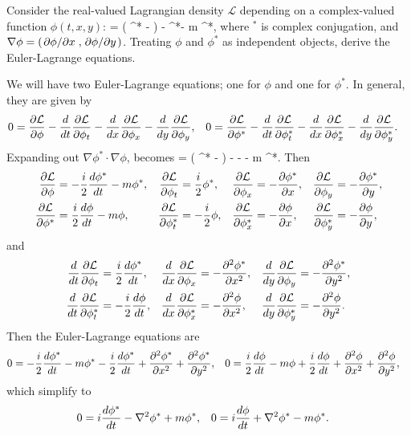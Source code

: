 \newcommand{\lap}{\nabla^2}
\newcommand{\Ld}{\mathcal{L}}
\newcommand{\phis}{\phi^*}

\newcommand{\phit}{\phi_t}
\newcommand{\phix}{\phi_x}
\newcommand{\phiy}{\phi_y}

\newcommand{\phist}{\phis_t}
\newcommand{\phisx}{\phis_x}
\newcommand{\phisy}{\phis_y}

\begin{problem}
	Consider the real-valued Lagrangian density $\Ld$ depending on a complex-valued function $\phi(t, x, y)$:
	\beqn \label{lagr2}
		\Ld =  \left( \phis {} - \dv{\phis}{t} \phi \right) - \nabla \phis \cdot \nabla \phi - m \phis \phi,
	\eeqn
	where $^*$ is complex conjugation, and $\nabla \phi = (\pdv*{\phi}{x}, \pdv*{\phi}{y})$.  Treating $\phi$ and $\phis$ as independent objects, derive the Euler-Lagrange equations.
\end{problem}

\begin{solution}
	We will have two Euler-Lagrange equations; one for $\phi$ and one for $\phis$.  In general, they are given by
	\begin{align*}
		0 &= \pdv{\Ld}{\phi} - \dv{}{t} \pdv{\Ld}{\phit} - \dv{}{x} \pdv{\Ld}{\phix} - \dv{}{y} \pdv{\Ld}{\phiy}, &
		0 &= \pdv{\Ld}{\phis} - \dv{}{t} \pdv{\Ld}{\phist} - \dv{}{x} \pdv{\Ld}{\phisx} - \dv{}{y} \pdv{\Ld}{\phisy}.
	\end{align*}
	Expanding out $\nabla \phis \cdot \nabla \phi$,  becomes
	\beq
		\Ld =  \left( \phis {} - \dv{\phis}{t} \phi \right) - \pdv{\phis}{x}  - \pdv{\phis}{y}  - m \phis \phi.
	\eeq
	Then
	\begin{align*}
		\pdv{\Ld}{\phi} &= -\frac{i}{2} \dv{\phis}{t} - m \phis, &
		\pdv{\Ld}{\phit} &= \frac{i}{2} \phis, &
		\pdv{\Ld}{\phix} &= -\pdv{\phis}{x}, &
		\pdv{\Ld}{\phiy} &= -\pdv{\phis}{y}, \\
		\pdv{\Ld}{\phis} &= \frac{i}{2} \dv{\phi}{t} - m \phi, &
		\pdv{\Ld}{\phist} &= -\frac{i}{2} \phi, &
		\pdv{\Ld}{\phisx} &= -\pdv{\phi}{x}, &
		\pdv{\Ld}{\phisy} &= -\pdv{\phi}{y},
	\end{align*}
	and
	\begin{align*}
		\dv{}{t} \pdv{\Ld}{\phit} &= \frac{i}{2} \dv{\phis}{t}, &
		\dv{}{x} \pdv{\Ld}{\phix} &= -\pdv[2]{\phis}{x}, &
		\dv{}{y} \pdv{\Ld}{\phiy} &= -\pdv[2]{\phis}{y}, \\
		\dv{}{t} \pdv{\Ld}{\phist} &= -\frac{i}{2} \dv{\phi}{t}, &
		\dv{}{x} \pdv{\Ld}{\phisx} &= -\pdv[2]{\phi}{x}, &
		\dv{}{y} \pdv{\Ld}{\phisy} &= -\pdv[2]{\phi}{y}.
	\end{align*}
	Then the Euler-Lagrange equations are
	\begin{align*}
		0 &= -\frac{i}{2} \dv{\phis}{t} - m \phis - \frac{i}{2} \dv{\phis}{t} + \pdv[2]{\phis}{x} + \pdv[2]{\phis}{y}, &
		0 &= \frac{i}{2} \dv{\phi}{t} - m \phi + \frac{i}{2} \dv{\phi}{t} + \pdv[2]{\phi}{x} + \pdv[2]{\phi}{y},
	\end{align*}
	which simplify to
	\begin{align*}
		0 &= i \dv{\phis}{t} - \lap \phis + m \phis, &
		0 &= i \dv{\phi}{t} + \lap \phis - m \phis.
	\end{align*}
\end{solution}